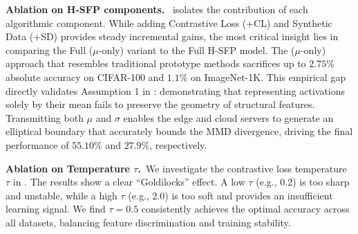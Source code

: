 \noindent\textbf{Ablation on H-SFP components.}~ isolates the contribution of each algorithmic component. While adding Contrastive Loss (+CL) and Synthetic Data (+SD) provides steady incremental gains, the most critical insight lies in comparing the Full ($\mu$-only) variant to the Full H-SFP model. The ($\mu$-only) approach that resembles traditional prototype methods sacrifices up to $2.75\%$ absolute accuracy on CIFAR-100 and $1.1\%$ on ImageNet-1K. This empirical gap directly validates Assumption 1 in : demonstrating that representing activations solely by their mean fails to preserve the geometry of structural features. Transmitting both $\mu$ and $\sigma$ enables the edge and cloud servers to generate an elliptical boundary that accurately bounds the MMD divergence, driving the final performance of $55.10\%$ and $27.9\%$, respectively.

\noindent\textbf{Ablation on Temperature $\tau$.}~We investigate the contrastive loss temperature $\tau$ in . The results show a clear ``Goldilocks'' effect. A low $\tau$ (e.g., $0.2$) is too sharp and unstable, while a high $\tau$ (e.g., $2.0$) is too soft and provides an insufficient learning signal. We find $\tau=0.5$ consistently achieves the optimal accuracy across all datasets, balancing feature discrimination and training stability.
